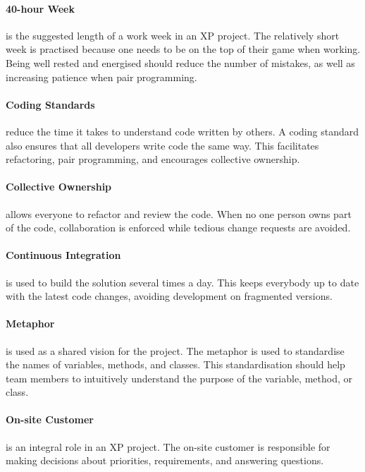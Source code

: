 \paragraph{40-hour Week} is the suggested length of a work week in an XP project.
The relatively short week is practised because one needs to be on the top of their game when working.
Being well rested and energised should reduce the number of mistakes, as well as increasing patience when pair programming.

\paragraph{Coding Standards} reduce the time it takes to understand code written by others.
A coding standard also ensures that all developers write code the same way.
This facilitates refactoring, pair programming, and encourages collective ownership.

\paragraph{Collective Ownership} allows everyone to refactor and review the code.
When no one person owns part of the code, collaboration is enforced while tedious change requests are avoided.

\paragraph{Continuous Integration} is used to build the solution several times a day.
This keeps everybody up to date with the latest code changes, avoiding development on fragmented versions.

\paragraph{Metaphor} is used as a shared vision for the project.
The metaphor is used to standardise the names of variables, methods, and classes. 
This standardisation should help team members to intuitively understand the purpose of the variable, method, or class.

\paragraph{On-site Customer} is an integral role in an XP project.
The on-site customer is responsible for making decisions about priorities, requirements, and answering questions.

